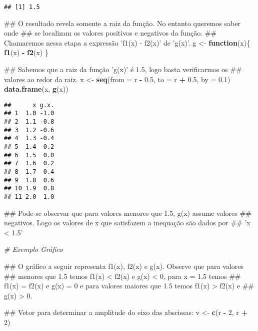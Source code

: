 \documentclass[]{book}
\newenvironment{Shaded}{\begin{snugshade}}{\end{snugshade}}
\newcommand{\KeywordTok}[1]{\textcolor[rgb]{0.13,0.29,0.53}{\textbf{#1}}}
\newcommand{\DataTypeTok}[1]{\textcolor[rgb]{0.13,0.29,0.53}{#1}}
\newcommand{\DecValTok}[1]{\textcolor[rgb]{0.00,0.00,0.81}{#1}}
\newcommand{\FloatTok}[1]{\textcolor[rgb]{0.00,0.00,0.81}{#1}}
\newcommand{\StringTok}[1]{\textcolor[rgb]{0.31,0.60,0.02}{#1}}
\newcommand{\CommentTok}[1]{\textcolor[rgb]{0.56,0.35,0.01}{\textit{#1}}}
\newcommand{\ControlFlowTok}[1]{\textcolor[rgb]{0.13,0.29,0.53}{\textbf{#1}}}
\newcommand{\OperatorTok}[1]{\textcolor[rgb]{0.81,0.36,0.00}{\textbf{#1}}}
\newcommand{\NormalTok}[1]{#1}
\begin{document}
\begin{enumerate}
\begin{verbatim}
## [1] 1.5
\end{verbatim}

\begin{Shaded}
\begin{Highlighting}[]
\NormalTok{##  O resultado revela somente a raiz da função. No entanto queremos saber onde}
\NormalTok{## se localizam os valores positivos e negativos da função.}
\NormalTok{##  Chamaremos nessa etapa a expressão 'f1(x) - f2(x)' de 'g(x)'.}
\NormalTok{g <-}\StringTok{ }\ControlFlowTok{function}\NormalTok{(x)\{}
  \KeywordTok{f1}\NormalTok{(x) }\OperatorTok{-}\StringTok{ }\KeywordTok{f2}\NormalTok{(x)}
\NormalTok{\}}

\NormalTok{##  Sabemos que a raiz da função 'g(x)' é 1.5, logo basta verificarmos os}
\NormalTok{## valores ao redor da raiz.}
\NormalTok{x <-}\StringTok{ }\KeywordTok{seq}\NormalTok{(}\DataTypeTok{from =}\NormalTok{ r }\OperatorTok{-}\StringTok{ }\FloatTok{0.5}\NormalTok{, }\DataTypeTok{to =}\NormalTok{ r }\OperatorTok{+}\StringTok{ }\FloatTok{0.5}\NormalTok{, }\DataTypeTok{by =} \FloatTok{0.1}\NormalTok{)}
\KeywordTok{data.frame}\NormalTok{(x, }\KeywordTok{g}\NormalTok{(x))}
\end{Highlighting}
\end{Shaded}

\begin{verbatim}
##      x g.x.
## 1  1.0 -1.0
## 2  1.1 -0.8
## 3  1.2 -0.6
## 4  1.3 -0.4
## 5  1.4 -0.2
## 6  1.5  0.0
## 7  1.6  0.2
## 8  1.7  0.4
## 9  1.8  0.6
## 10 1.9  0.8
## 11 2.0  1.0
\end{verbatim}

\begin{Shaded}
\begin{Highlighting}[]
\NormalTok{##  Pode-se observar que para valores menores que 1.5, g(x) assume valores}
\NormalTok{## negativos. Logo os valores de x que satisfazem a inequação são dados por}
\NormalTok{## 'x < 1.5'}

\CommentTok{# Exemplo Gráfico}

\NormalTok{##  O gráfico a seguir representa f1(x), f2(x) e g(x). Observe que para valores}
\NormalTok{## menores que 1.5 temos f1(x) < f2(x) e g(x) < 0, para x = 1.5 temos}
\NormalTok{## f1(x) = f2(x) e g(x) = 0 e para valores maiores que 1.5 temos f1(x) > f2(x) e}
\NormalTok{## g(x) > 0.}

\NormalTok{##  Vetor para determinar a amplitude do eixo das abscissas:}
\NormalTok{v <-}\StringTok{ }\KeywordTok{c}\NormalTok{(r }\OperatorTok{-}\StringTok{ }\DecValTok{2}\NormalTok{, r }\OperatorTok{+}\StringTok{ }\DecValTok{2}\NormalTok{)}


\end{Highlighting}
\end{Shaded}
\end{enumerate}
\end{document}
